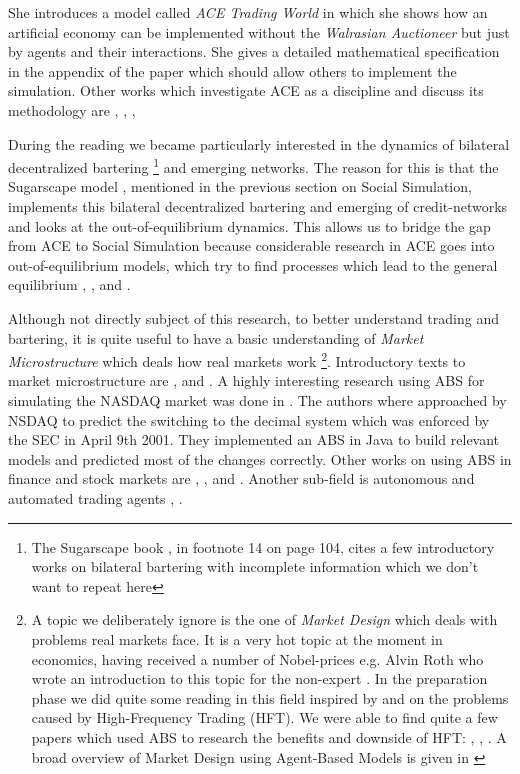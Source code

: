 She introduces a model called \textit{ACE Trading World} in which she shows how an artificial economy can be implemented without the \textit{Walrasian Auctioneer} but just by agents and their interactions. She gives a detailed mathematical specification in the appendix of the paper which should allow others to implement the simulation. Other works which investigate ACE as a discipline and discuss its methodology are \cite{tesfatsion_agent-based_2002}, \cite{richiardi_agent-based_2007}, \cite{ballot_agent-based_2015}, \cite{blume_introduction_2015}

During the reading we became particularly interested in the dynamics of bilateral decentralized bartering \footnote{The Sugarscape book \cite{epstein_growing_1996}, in footnote 14 on page 104, cites a few introductory works on bilateral bartering with incomplete information which we don't want to repeat here} and emerging networks. The reason for this is that the Sugarscape model \cite{epstein_growing_1996}, mentioned in the previous section on Social Simulation, implements this bilateral decentralized bartering and emerging of credit-networks and looks at the out-of-equilibrium dynamics. This allows us to bridge the gap from ACE to Social Simulation because considerable research in ACE goes into out-of-equilibrium models, which try to find processes which lead to the general equilibrium \cite{gintis_emergence_2006}, \cite{gintis_dynamics_2007}, \cite{arthur_out--equilibrium_2006} and \cite{botta_functional_2011}.

Although not directly subject of this research, to better understand trading and bartering, it is quite useful to have a basic understanding of \textit{Market Microstructure} which deals how real markets work \footnote{A topic we deliberately ignore is the one of \textit{Market Design} which deals with problems real markets face. It is a very hot topic at the moment in economics, having received a number of Nobel-prices e.g. Alvin Roth who wrote an introduction to this topic for the non-expert \cite{roth_who_2015}. In the preparation phase we did quite some reading in this field inspired by \cite{sornette_crashes_2011} and \cite{budish_editors_2015} on the problems caused by High-Frequency Trading (HFT). We were able to find quite a few papers which used ABS to research the benefits and downside of HFT: \cite{wah_latency_2013}, \cite{leal_rock_2016}, \cite{yim_effect_2015}. A broad overview of Market Design using Agent-Based Models is given in \cite{marks_chapter_2006}}. Introductory texts to market microstructure are \cite{harris_trading_2003}, \cite{baker_market_2013} and \cite{lehalle_market_2013}. A highly interesting research using ABS for simulating the NASDAQ market was done in \cite{darley_nasdaq_2007}. The authors where approached by NSDAQ to predict the switching to the decimal system which was enforced by the SEC in April 9th 2001. They implemented an ABS in Java to build relevant models and predicted most of the changes correctly. Other works on using ABS in finance and stock markets are \cite{lebaron_agent-based_2000}, \cite{lebaron_building_2002}, \cite{streltchenko_multi-agent_2005} and \cite{panayi_agent-based_2012}. Another sub-field is autonomous and automated trading agents \cite{mackie-mason_chapter_2006}, \cite{toulis_mertacor:_2006}.

